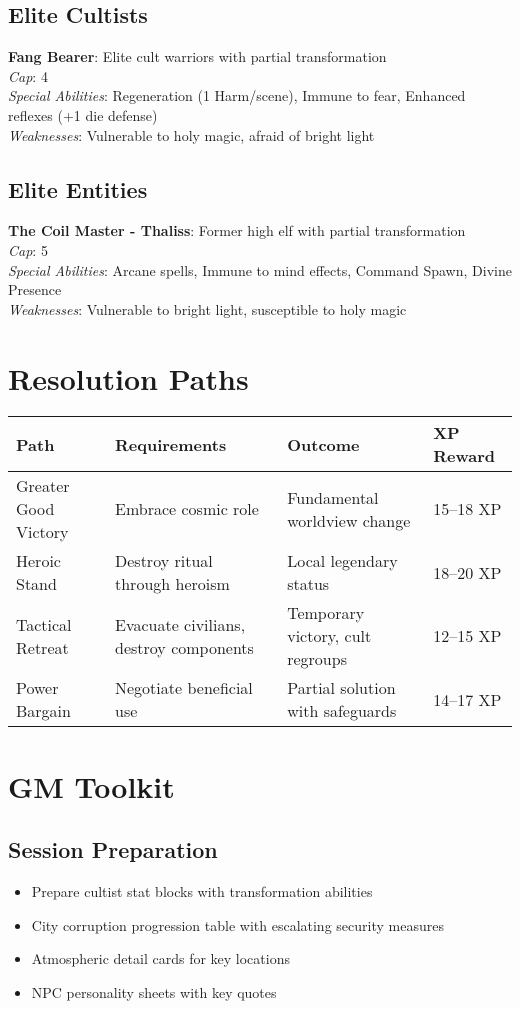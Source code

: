\documentclass[11pt]{article}
\begin{document}
\subsection*{Elite Cultists}
\textbf{Fang Bearer}: Elite cult warriors with partial transformation\\
\textit{Cap}: 4\\
\textit{Special Abilities}: Regeneration (1 Harm/scene), Immune to fear, Enhanced reflexes (+1 die defense)\\
\textit{Weaknesses}: Vulnerable to holy magic, afraid of bright light

\subsection*{Elite Entities}
\textbf{The Coil Master - Thaliss}: Former high elf with partial transformation\\
\textit{Cap}: 5\\
\textit{Special Abilities}: Arcane spells, Immune to mind effects, Command Spawn, Divine Presence\\
\textit{Weaknesses}: Vulnerable to bright light, susceptible to holy magic

\section*{Resolution Paths}

\begin{longtable}{|l|l|l|l|}
\hline
\textbf{Path} & \textbf{Requirements} & \textbf{Outcome} & \textbf{XP Reward} \\
\hline
Greater Good Victory & Embrace cosmic role & Fundamental worldview change & 15–18 XP \\
Heroic Stand & Destroy ritual through heroism & Local legendary status & 18–20 XP \\
Tactical Retreat & Evacuate civilians, destroy components & Temporary victory, cult regroups & 12–15 XP \\
Power Bargain & Negotiate beneficial use & Partial solution with safeguards & 14–17 XP \\
\hline
\end{longtable}

\section*{GM Toolkit}

\subsection*{Session Preparation}
\begin{itemize}
    \item Prepare cultist stat blocks with transformation abilities
    \item City corruption progression table with escalating security measures
    \item Atmospheric detail cards for key locations
    \item NPC personality sheets with key quotes
\end{itemize}
\end{document}
